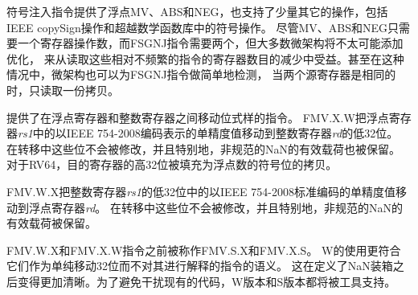 \begin{commentary}
  符号注入指令提供了浮点MV、ABS和NEG，也支持了少量其它的操作，包括IEEE copySign操作和超越数学函数库中的符号操作。
  尽管MV、ABS和NEG只需要一个寄存器操作数，而FSGNJ指令需要两个，但大多数微架构将不太可能添加优化，
  来从读取这些相对不频繁的指令的寄存器数目的减少中受益。甚至在这种情况中，微架构也可以为FSGNJ指令做简单地检测，
  当两个源寄存器是相同的时，只读取一份拷贝。
\end{commentary}

提供了在浮点寄存器和整数寄存器之间移动位式样的指令。
FMV.X.W把浮点寄存器{\em rs1}中的以IEEE 754-2008编码表示的单精度值移动到整数寄存器{\em rd}的低32位。
在转移中这些位不会被修改，并且特别地，非规范的NaN的有效载荷也被保留。
对于RV64，目的寄存器的高32位被填充为浮点数的符号位的拷贝。

FMV.W.X把整数寄存器{\em rs1}的低32位中的以IEEE 754-2008标准编码的单精度值移动到浮点寄存器{\em rd}。
在转移中这些位不会被修改，并且特别地，非规范的NaN的有效载荷被保留。

\begin{commentary}
  FMV.W.X和FMV.X.W指令之前被称作FMV.S.X和FMV.X.S。
  W的使用更符合它们作为单纯移动32位而不对其进行解释的指令的语义。
  这在定义了NaN装箱之后变得更加清晰。为了避免干扰现有的代码，W版本和S版本都将被工具支持。
\end{commentary}

